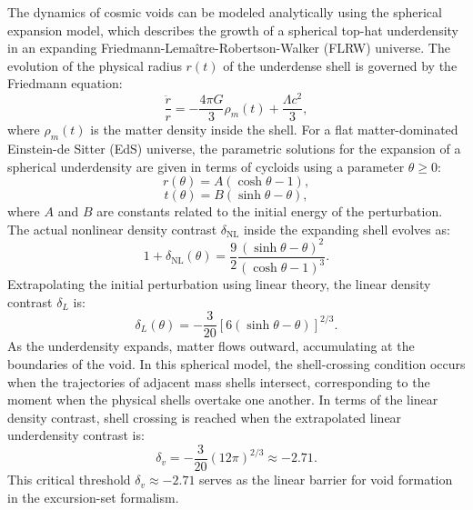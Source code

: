 \documentclass[12pt]{report}
\begin{document}
The dynamics of cosmic voids can be modeled analytically using the spherical expansion model, which describes the growth of a spherical top-hat underdensity in an expanding Friedmann-Lemaître-Robertson-Walker (FLRW) universe. The evolution of the physical radius $r(t)$ of the underdense shell is governed by the Friedmann equation:
\begin{equation}
    \frac{\ddot{r}}{r} = -\frac{4\pi G}{3}\rho_m(t) + \frac{\Lambda c^2}{3},
\end{equation}
where $\rho_m(t)$ is the matter density inside the shell. For a flat matter-dominated Einstein-de Sitter (EdS) universe, the parametric solutions for the expansion of a spherical underdensity are given in terms of cycloids using a parameter $\theta \ge 0$:
\begin{equation}
    r(\theta) = A (\cosh\theta - 1),
\end{equation}
\begin{equation}
    t(\theta) = B (\sinh\theta - \theta),
\end{equation}
where $A$ and $B$ are constants related to the initial energy of the perturbation. The actual nonlinear density contrast $\delta_{\mathrm{NL}}$ inside the expanding shell evolves as:
\begin{equation}
    1 + \delta_{\mathrm{NL}}(\theta) = \frac{9}{2} \frac{(\sinh\theta - \theta)^2}{(\cosh\theta - 1)^3}
    \label{eq:spherical_delta_nl}.
\end{equation}
Extrapolating the initial perturbation using linear theory, the linear density contrast $\delta_L$ is:
\begin{equation}
    \delta_L(\theta) = -\frac{3}{20} [6(\sinh\theta - \theta)]^{2/3}
    \label{eq:spherical_delta_l}.
\end{equation}
As the underdensity expands, matter flows outward, accumulating at the boundaries of the void. In this spherical model, the shell-crossing condition occurs when the trajectories of adjacent mass shells intersect, corresponding to the moment when the physical shells overtake one another. In terms of the linear density contrast, shell crossing is reached when the extrapolated linear underdensity contrast is:
\begin{equation}
    \delta_v = -\frac{3}{20} (12\pi)^{2/3} \approx -2.71
    \label{eq:shell_crossing_barrier}.
\end{equation}
This critical threshold $\delta_v \approx -2.71$ serves as the linear barrier for void formation in the excursion-set formalism. 
\end{document}

